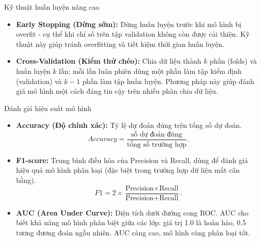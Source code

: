 \documentclass{beamer}
\begin{document}
\begin{frame}{Kỹ thuật huấn luyện nâng cao}
    \begin{itemize}
        \item \textbf{Early Stopping (Dừng sớm):} Dừng huấn luyện trước khi mô hình bị overfit - cụ thể khi chỉ số trên tập validation không còn được cải thiện. Kỹ thuật này giúp tránh overfitting và tiết kiệm thời gian huấn luyện.
        \item \textbf{Cross-Validation (Kiểm thử chéo):} Chia dữ liệu thành $k$ phần (folds) và huấn luyện $k$ lần; mỗi lần luân phiên dùng một phần làm tập kiểm định (validation) và $k-1$ phần làm tập huấn luyện. Phương pháp này giúp đánh giá mô hình một cách đáng tin cậy trên nhiều phân chia dữ liệu.
    \end{itemize}
\end{frame}

\begin{frame}{Đánh giá hiệu suất mô hình}
    \begin{itemize}
        \item \textbf{Accuracy (Độ chính xác):} Tỷ lệ dự đoán đúng trên tổng số dự đoán. $$Accuracy = \frac{\text{số dự đoán đúng}}{\text{tổng số trường hợp}}.$$
        \item \textbf{F1-score:} Trung bình điều hòa của Precision và Recall, dùng để đánh giá hiệu quả mô hình phân loại (đặc biệt trong trường hợp dữ liệu mất cân bằng). $$F1 = 2 \times \frac{\text{Precision} \times \text{Recall}}{\text{Precision} + \text{Recall}}.$$
        \item \textbf{AUC (Area Under Curve):} Diện tích dưới đường cong ROC. AUC cho biết khả năng mô hình phân biệt giữa các lớp: giá trị 1.0 là hoàn hảo, 0.5 tương đương đoán ngẫu nhiên. AUC càng cao, mô hình càng phân loại tốt.
    \end{itemize}
\end{frame}

\end{document}

